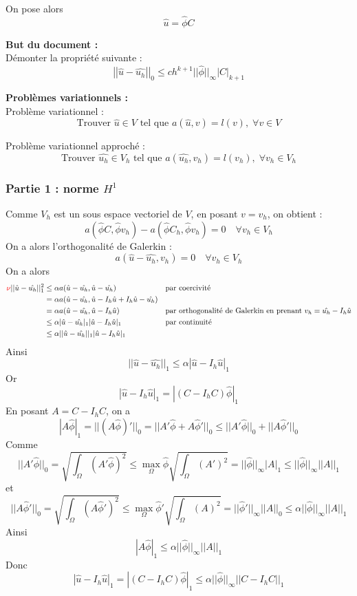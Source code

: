 On pose alors
$$\hat{u}=\hat{\phi}C$$

\textbf{But du document :} \\
Démonter la propriété suivante :
\begin{equation}
	\left|\left|\hat{u}-\hat{u_h}\right|\right|_0\le ch^{k+1}||\hat{\phi}||_\infty\left|C\right|_{k+1}
	\label{ine_a_dem}
\end{equation}

\textbf{Problèmes variationnels :} \\

Problème variationnel :
$$\text{Trouver } \hat{u}\in V \text{ tel que } a(\hat{u},v)=l(v), \;\forall v\in V$$

Problème variationnel approché :
$$\text{Trouver } \hat{u_h}\in V_h \text{ tel que } a(\hat{u_h},v_h)=l(v_h), \;\forall v_h\in V_h$$

\subsubsection*{Partie 1 : norme $H^1$}

Comme $V_h$ est un sous espace vectoriel de $V$, en posant $v=v_h$, on obtient :
$$a(\hat{\phi}C,\hat{\phi}v_h)-a(\hat{\phi}C_h,\hat{\phi}v_h)=0 \quad \forall v_h\in V_h$$
On a alors l'orthogonalité de Galerkin : \color{red}{(ATTENTION : Abus de notation sur $v_h$ !)}\color{black}
$$a(\hat{u}-\hat{u_h},v_h)=0 \quad \forall v_h\in V_h$$
On a alors
\begin{align*}
	\color{red}{\nu}\color{black}||\hat{u}-\hat{u_h}||_1^2&\le\alpha a(\hat{u}-\hat{u_h},\hat{u}-\hat{u_h}) &&\text{par coercivité} \\
	&=\alpha a(\hat{u}-\hat{u_h},\hat{u}-I_h\hat{u}+I_h\hat{u}-\hat{u_h}) \\
	&=\alpha a(\hat{u}-\hat{u_h},\hat{u}-I_h\hat{u}) &&\text{par orthogonalité de Galerkin en prenant } v_h=\hat{u_h}-I_h\hat{u} \\
	&\le\alpha |\hat{u}-\hat{u_h}|_1|\hat{u}-I_h\hat{u}|_1 &&\text{par continuité} \\
	&\le\alpha ||\hat{u}-\hat{u_h}||_1|\hat{u}-I_h\hat{u}|_1
\end{align*}
Ainsi
$$||\hat{u}-\hat{u_h}||_1\le\alpha|\hat{u}-I_h\hat{u}|_1$$
Or 
$$|\hat{u}-I_h\hat{u}|_1=|(C-I_hC)\hat{\phi}|_1$$
En posant $A=C-I_hC$, on a
$$|A\hat{\phi}|_1=||(A\hat{\phi})'||_0=||A'\hat{\phi}+A\hat{\phi}'||_0\le||A'\hat{\phi}||_0+||A\hat{\phi}'||_0$$
Comme
$$||A'\hat{\phi}||_0=\sqrt{\int_\Omega(A'\hat{\phi})^2}\le \max_\Omega \hat{\phi}\sqrt{\int_\Omega(A')^2}=||\hat{\phi}||_\infty|A|_1\le||\hat{\phi}||_\infty||A||_1$$
et
$$||A\hat{\phi}'||_0=\sqrt{\int_\Omega(A\hat{\phi}')^2}\le \max_\Omega \hat{\phi}'\sqrt{\int_\Omega(A)^2}=||\hat{\phi}'||_\infty||A||_0\le \alpha||\hat{\phi}||_\infty||A||_1$$
Ainsi
$$|A\hat{\phi}|_1\le\alpha ||\hat{\phi}||_\infty||A||_1$$
Donc
$$|\hat{u}-I_h\hat{u}|_1=|(C-I_hC)\hat{\phi}|_1\le\alpha ||\hat{\phi}||_\infty||C-I_hC||_1$$

